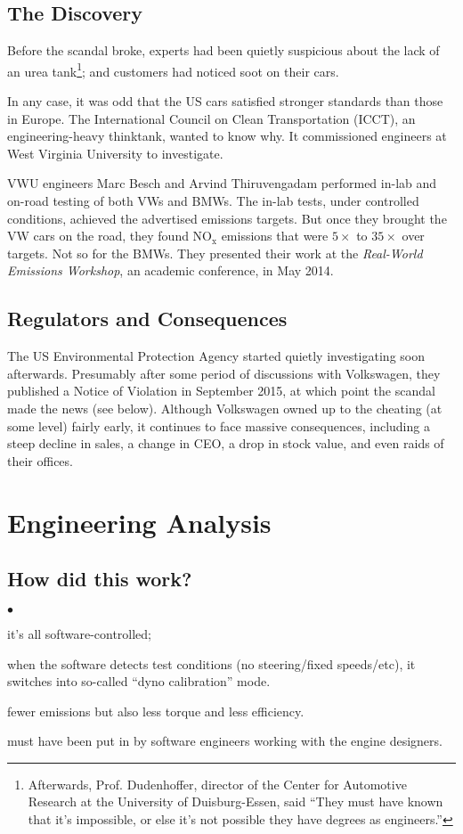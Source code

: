 \documentclass[11pt]{article}
\newcommand{\squishlist}{
 \begin{list}{$\bullet$}
  { \setlength{\itemsep}{0pt}
     \setlength{\parsep}{3pt}
     \setlength{\topsep}{3pt}
     \setlength{\partopsep}{0pt}
     \setlength{\leftmargin}{1.5em}
     \setlength{\labelwidth}{1em}
     \setlength{\labelsep}{0.5em} } }
\newcommand{\squishend}{
  \end{list}  }
\begin{document}
\subsection*{The Discovery}
Before the scandal broke, experts had been quietly suspicious about
the lack of an urea tank\footnote{Afterwards, Prof. Dudenhoffer, director of the Center for Automotive Research at the University of Duisburg-Essen, said ``They must have known that it's impossible, or else it's not possible they have degrees as engineers.''}; and customers had noticed soot on their
cars. 

In any case, it was odd that the US cars satisfied stronger standards
than those in Europe. The International Council on Clean
Transportation (ICCT), an engineering-heavy thinktank, wanted to know
why. It commissioned engineers at West Virginia University to
investigate.

VWU engineers Marc Besch and Arvind Thiruvengadam performed in-lab and
on-road testing of both VWs and BMWs. The in-lab tests, under
controlled conditions, achieved the advertised emissions targets. But once
they brought the VW cars on the road, they found NO$_\mathrm{x}$ emissions
that were $5\times$ to $35\times$ over targets. Not so for the BMWs. They presented
their work at the \emph{Real-World Emissions Workshop}, an academic conference,
in May 2014.

\subsection*{Regulators and Consequences}

The US Environmental Protection Agency started quietly investigating
soon afterwards.  Presumably after some period of discussions with
Volkswagen, they published a Notice of Violation in September 2015, at
which point the scandal made the news (see below). Although Volkswagen
owned up to the cheating (at some level) fairly early, it
continues to face massive consequences, including a steep decline in
sales, a change in CEO, a drop in stock value, and even raids of their
offices.

\section*{Engineering Analysis}

\subsection*{How did this work?}
\squishlist
\item it's all software-controlled;
\item when the software detects test conditions (no steering/fixed speeds/etc), it switches into so-called ``dyno calibration'' mode.
\item fewer emissions but also less torque and less efficiency.
\item must have been put in by software engineers working with the engine designers.
\squishend
\end{document}
